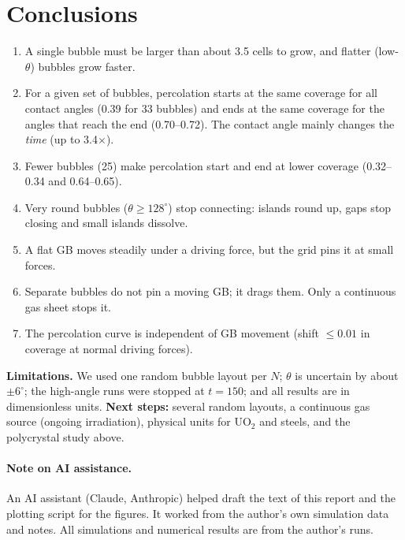 \documentclass[11pt,a4paper]{article}
\begin{document}
\section{Conclusions}

\begin{enumerate}
  \item A single bubble must be larger than about 3.5 cells to grow, and flatter
        (low-$\theta$) bubbles grow faster.
  \item For a given set of bubbles, percolation starts at the same coverage for
        all contact angles (0.39 for 33 bubbles) and ends at the same coverage for
        the angles that reach the end (0.70--0.72). The contact angle mainly
        changes the \emph{time} (up to 3.4$\times$).
  \item Fewer bubbles (25) make percolation start and end at lower coverage
        (0.32--0.34 and 0.64--0.65).
  \item Very round bubbles ($\theta\ge128^\circ$) stop connecting: islands round
        up, gaps stop closing and small islands dissolve.
  \item A flat GB moves steadily under a driving force, but the grid pins it at
        small forces.
  \item Separate bubbles do not pin a moving GB; it drags them. Only a continuous
        gas sheet stops it.
  \item The percolation curve is independent of GB movement (shift $\le0.01$ in
        coverage at normal driving forces).
\end{enumerate}

\textbf{Limitations.} We used one random bubble layout per $N$; $\theta$ is
uncertain by about $\pm6^\circ$; the high-angle runs were stopped at $t=150$; and
all results are in dimensionless units. \textbf{Next steps:} several random
layouts, a continuous gas source (ongoing irradiation), physical units for
UO$_2$ and steels, and the polycrystal study above.

\paragraph{Note on AI assistance.} An AI assistant (Claude, Anthropic) helped
draft the text of this report and the plotting script for the figures. It
worked from the author's own simulation data and notes. All simulations and
numerical results are from the author's runs.
\end{document}
